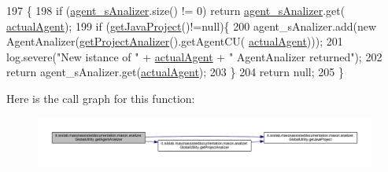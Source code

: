 \begin{DoxyCode}
197                                                    \{
198         \textcolor{keywordflow}{if} (\hyperlink{classit_1_1isislab_1_1masonassisteddocumentation_1_1mason_1_1analizer_1_1_global_utility_aad25923935f25b348200a005914af973}{agent\_sAnalizer}.size() != 0) \textcolor{keywordflow}{return} \hyperlink{classit_1_1isislab_1_1masonassisteddocumentation_1_1mason_1_1analizer_1_1_global_utility_aad25923935f25b348200a005914af973}{agent\_sAnalizer}.get(
      \hyperlink{classit_1_1isislab_1_1masonassisteddocumentation_1_1mason_1_1analizer_1_1_global_utility_ad969120645ce5135ca95177f6bb5ce42}{actualAgent});
199         \textcolor{keywordflow}{if} (\hyperlink{classit_1_1isislab_1_1masonassisteddocumentation_1_1mason_1_1analizer_1_1_global_utility_ab1fa2a5ac258d0119ca7d486261c01fb}{getJavaProject}()!=null)\{
200             agent\_sAnalizer.add(\textcolor{keyword}{new} AgentAnalizer(\hyperlink{classit_1_1isislab_1_1masonassisteddocumentation_1_1mason_1_1analizer_1_1_global_utility_a78cbdc6022c558d1375a01095ad95659}{getProjectAnalizer}().getAgentCU(
      \hyperlink{classit_1_1isislab_1_1masonassisteddocumentation_1_1mason_1_1analizer_1_1_global_utility_ad969120645ce5135ca95177f6bb5ce42}{actualAgent})));
201             log.severe(\textcolor{stringliteral}{"New istance of "} + \hyperlink{classit_1_1isislab_1_1masonassisteddocumentation_1_1mason_1_1analizer_1_1_global_utility_ad969120645ce5135ca95177f6bb5ce42}{actualAgent} + \textcolor{stringliteral}{" AgentAnalizer returned"});
202             \textcolor{keywordflow}{return} agent\_sAnalizer.get(\hyperlink{classit_1_1isislab_1_1masonassisteddocumentation_1_1mason_1_1analizer_1_1_global_utility_ad969120645ce5135ca95177f6bb5ce42}{actualAgent});
203         \}
204         \textcolor{keywordflow}{return} null;
205     \}
\end{DoxyCode}


Here is the call graph for this function\-:\nopagebreak
\begin{figure}[H]
\begin{center}
\leavevmode
\includegraphics[width=350pt]{classit_1_1isislab_1_1masonassisteddocumentation_1_1mason_1_1analizer_1_1_global_utility_adf157ad87f33184753c407314fd34121_cgraph}
\end{center}
\end{figure}




